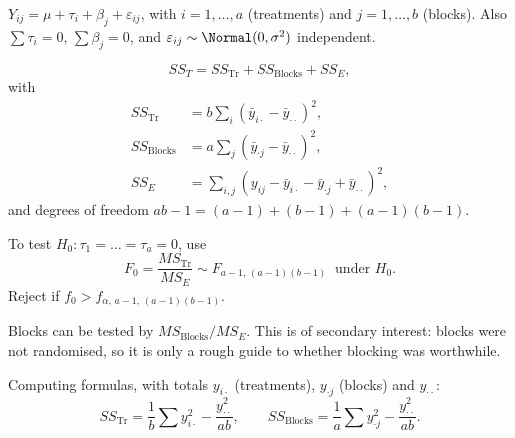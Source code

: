 \begin{definition}
$Y_{ij}=\mu+\tau_i+\beta_j+\varepsilon_{ij}$, with $i=1,\dots,a$ (treatments) and $j=1,\dots,b$ (blocks). Also $\sum\tau_i=0$, $\sum\beta_j=0$, and $\varepsilon_{ij}\sim\Normal(0,\sigma^2)$ independent.
\end{definition}

\begin{theorem}\label{thm:rcbd-ss}
\[ SS_T=SS_{\mathrm{Tr}}+SS_{\mathrm{Blocks}}+SS_E, \]
with
\begin{align*}
SS_{\mathrm{Tr}}&=b\sum_i(\bar{y}_{i\cdot}-\bar{y}_{\cdot\cdot})^2,\\
SS_{\mathrm{Blocks}}&=a\sum_j(\bar{y}_{\cdot j}-\bar{y}_{\cdot\cdot})^2,\\
SS_E&=\sum_{i,j}(y_{ij}-\bar{y}_{i\cdot}-\bar{y}_{\cdot j}+\bar{y}_{\cdot\cdot})^2,
\end{align*}
and degrees of freedom $ab-1=(a-1)+(b-1)+(a-1)(b-1)$.
\end{theorem}

\begin{theorem}\label{thm:rcbd-F}
To test $H_0:\tau_1=\dots=\tau_a=0$, use
\[ F_0=\frac{MS_{\mathrm{Tr}}}{MS_E}\sim F_{a-1,\,(a-1)(b-1)}\ \text{ under }H_0. \]
Reject if $f_0>f_{\alpha,\,a-1,\,(a-1)(b-1)}$.

Blocks can be tested by $MS_{\mathrm{Blocks}}/MS_E$. This is of secondary interest: blocks were not randomised, so it is only a rough guide to whether blocking was worthwhile.
\end{theorem}

Computing formulas, with totals $y_{i\cdot}$ (treatments), $y_{\cdot j}$ (blocks) and $y_{\cdot\cdot}$:
\[ SS_{\mathrm{Tr}}=\frac1b\sum y_{i\cdot}^2-\frac{y_{\cdot\cdot}^2}{ab},\qquad SS_{\mathrm{Blocks}}=\frac1a\sum y_{\cdot j}^2-\frac{y_{\cdot\cdot}^2}{ab}. \]

